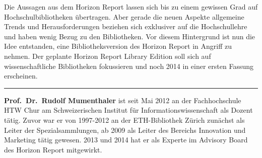 \documentclass[a4paper,
fontsize=11pt,
oneside,
numbers=noperiodatend,
parskip=half-,
bibliography=totoc,
final
]{scrartcl}
\begin{document}
Die Aussagen aus dem Horizon Report lassen sich bis zu einem gewissen
Grad auf Hochschulbibliotheken übertragen. Aber gerade die neuen Aspekte
allgemeine Trends und Herausforderungen beziehen sich exklusiver auf die
Hochschullehre und haben wenig Bezug zu den Bibliotheken. Vor diesem
Hintergrund ist nun die Idee entstanden, eine Bibliotheksversion des
Horizon Report in Angriff zu nehmen. Der geplante Horizon Report Library
Edition soll sich auf wissenschaftliche Bibliotheken fokussieren und
noch 2014 in einer ersten Fassung erscheinen.

\begin{center}\rule{3in}{0.4pt}\end{center}

\textbf{Prof.~Dr.~Rudolf Mumenthaler} ist seit Mai 2012 an der
Fachhochschule HTW Chur am Schweizerischen Institut für
Informationswissenschaft als Dozent tätig. Zuvor war er von 1997-2012 an
der ETH-Bibliothek Zürich zunächst als Leiter der Spezialsammlungen, ab
2009 als Leiter des Bereichs Innovation und Marketing tätig gewesen.
2013 und 2014 hat er als Experte im Advisory Board des Horizon Report
mitgewirkt.

\end{document}
